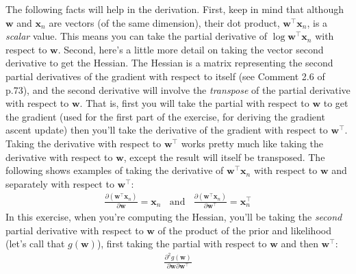 \documentclass[10pt]{article}
\begin{document}
\begin{itemize}
The following facts will help in the derivation.  
First, keep in mind that although $\mathbf{w}$ and $\mathbf{x}_n$ are vectors (of the same dimension), their dot product, $\mathbf{w}^\top\mathbf{x}_n$, is a {\em scalar} value.  This means you can take the partial derivative of $\log \mathbf{w}^\top\mathbf{x}_n$ with respect to $\mathbf{w}$.  
Second, here's a little more detail on taking the vector second derivative to get the Hessian. The Hessian is a matrix representing the second partial derivatives of the gradient with respect to itself (see Comment 2.6 of p.73), and the second derivative will involve the {\em transpose} of the partial derivative with respect to $\mathbf{w}$. That is, first you will take the partial with respect to $\mathbf{w}$ to get the gradient (used for the first part of the exercise, for deriving the gradient ascent update) then you'll take the derivative of the gradient with respect to $\mathbf{w}^\top$. Taking the derivative with respect to $\mathbf{w}^\top$ works pretty much like taking the derivative with respect to $\mathbf{w}$, except the result will itself be transposed. The following shows examples of taking the derivative of $\mathbf{w}^\top \mathbf{x}_n$ with respect to $\mathbf{w}$ and separately with respect to $\mathbf{w}^\top$:
\begin{eqnarray*}
\frac{\partial (\mathbf{w}^\top \mathbf{x}_n)}{\partial \mathbf{w}} = \mathbf{x}_n
~~~~\mathrm{and}~~~~
\frac{\partial (\mathbf{w}^\top \mathbf{x}_n)}{\partial \mathbf{w}^\top} = \mathbf{x}_n^\top
\end{eqnarray*}
In this exercise, when you're computing the Hessian, you'll be taking the {\em second} partial derivative with respect to $\mathbf{w}$ of the product of the prior and likelihood (let's call that $g(\mathbf{w})$), first taking the partial with respect to $\mathbf{w}$ and then $\mathbf{w}^\top$:
\begin{eqnarray*}
\frac{\partial^2 g(\mathbf{w})}{\partial \mathbf{w} \partial \mathbf{w}^\top}
\end{eqnarray*}


\end{itemize}
\end{document}
